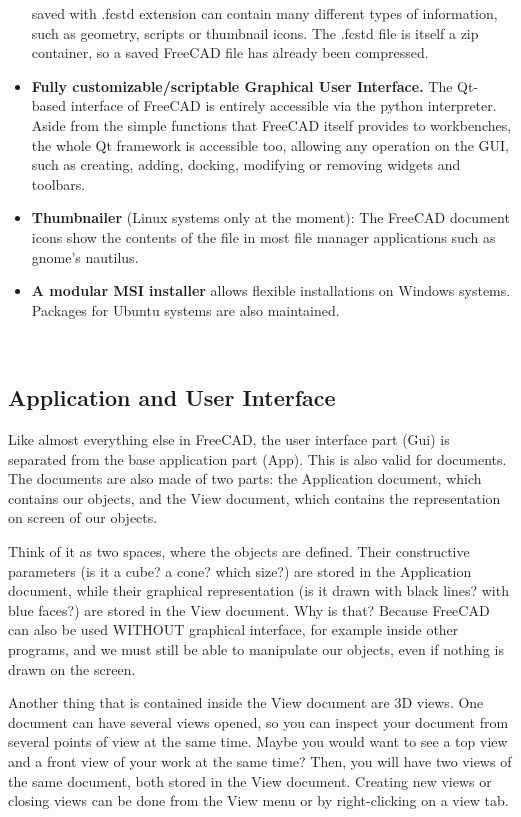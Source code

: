 \begin{itemize}
saved with .fcstd extension can contain many different types of information, 
such as geometry, scripts or thumbnail icons. The .fcstd file is itself a 
zip container, so a saved FreeCAD file has already been compressed.
\item \textbf{Fully customizable/scriptable Graphical User Interface.} The Qt-based 
interface of FreeCAD is entirely accessible via the python interpreter. 
Aside from the simple functions that FreeCAD itself provides to workbenches, 
the whole Qt framework is accessible too, allowing any operation on the GUI, 
such as creating, adding, docking, modifying or removing widgets and toolbars.
\item \textbf{Thumbnailer} (Linux systems only at the moment): The FreeCAD 
document icons show the contents of the file in most file manager applications 
such as gnome's nautilus.
\item \textbf{A modular MSI installer} allows flexible installations on Windows 
systems. Packages for Ubuntu systems are also maintained.
\end{itemize}

\
\
\

\subsection{Application and User Interface}
Like almost everything else in FreeCAD, the user interface part (Gui) is 
separated from the base application part (App). This is also valid for 
documents. The documents are also made of two parts: the Application document, 
which contains our objects, and the View document, which contains the 
representation on screen of our objects.

Think of it as two spaces, where the objects are defined. Their constructive 
parameters (is it a cube? a cone? which size?) are stored in the Application 
document, while their graphical representation (is it drawn with black lines? 
with blue faces?) are stored in the View document. Why is that? Because 
FreeCAD can also be used WITHOUT graphical interface, for example inside 
other programs, and we must still be able to manipulate our objects, even 
if nothing is drawn on the screen.

Another thing that is contained inside the View document are 3D views. 
One document can have several views opened, so you can inspect your document 
from several points of view at the same time. Maybe you would want to see a 
top view and a front view of your work at the same time? Then, you will have 
two views of the same document, both stored in the View document. Creating 
new views or closing views can be done from the View menu or by right-clicking 
on a view tab.

